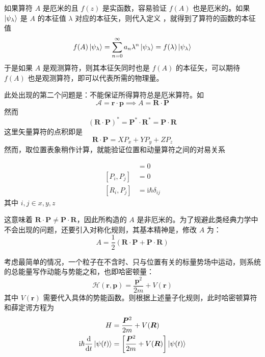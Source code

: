 \documentclass[cn,10pt,math=newtx,citestyle=gb7714-2015,bibstyle=gb7714-2015]{elegantbook}
\def\bm{\boldsymbol}
\def\mc{\mathcal}
\def\d{\mathrm d}
\def\i{\mathrm i}
\begin{document}
如果算符 $A$ 是厄米的且 $f(z)$ 是实函数，容易验证 $f(A)$ 也是厄米的。如果 $\ket{\psi_\lambda}$ 是 $A$ 的本征值 $\lambda$ 对应的本征矢，则代入定义 ，就得到了算符的函数的本征值
\begin{equation}
    \label{eq:opfunceigenval}
    f(A)\ket{\psi_\lambda}=\sum_{n=0}^\infty a_n\lambda^n\ket{\psi_\lambda}=f(\lambda)\ket{\psi_\lambda}
\end{equation}
于是如果 $A$ 是观测算符，则其本征矢同时也是 $f(A)$ 的本征矢，可以期待 $f(A)$ 也是观测算符，即可以代表所需的物理量。

此处出现的第二个问题是：不能保证所得算符总是厄米算符。如
\begin{equation}
   \bm{\mc A}=\bm r\cdot\bm p\implies A=\bm R\cdot\bm P
\end{equation}
然而
\begin{equation}
   (\bm R\cdot\bm P)^*=\bm P^*\cdot\bm R^*=\bm P\cdot\bm R
\end{equation}
这里矢量算符的点积即是
\begin{equation}
   \bm R\cdot\bm P=XP_x+YP_y+ZP_z
\end{equation}
然而，取位置表象稍作计算，就能验证位置和动量算符之间的对易关系
\begin{theorem}[正则对易关系]\label{thm:commuterp}
\begin{align}
    [R_i,R_j]&=0\\
    [P_i,P_j]&=0\\
    [R_i,P_j]&=\i\hbar\delta_{ij}
\end{align}
其中 $i,j\in{x,y,z}$
\end{theorem}
这意味着 $\bm R\cdot \bm P\ne \bm P\cdot \bm R$，因此所构造的 $A$ 是非厄米的。为了规避此类经典力学中不会出现的问题，还要引入对称化规则，其基本精神是，修改 $A$ 为：
\begin{equation}
   A=\frac 1 2(\bm R\cdot\bm P+\bm P\cdot\bm R)
\end{equation}

考虑最简单的情况，一个粒子在不含时、只与位置有关的标量势场中运动，则系统的总能量写作动能与势能之和，也即哈密顿量：
\begin{equation}
   \mc H(\bm r, \bm p)=\frac{\bm p^2}{2m}+V(\bm r)
\end{equation}
其中 $V(\bm r)$ 需要代入具体的势能函数。则根据上述量子化规则，此时哈密顿算符和薛定谔方程为
\begin{align}
   H&=\frac{\bm P^2}{2m}+V(\bm R)\\
   \i\hbar\frac{\d}{\d t}\ket{\psi(t)}&=\left[\frac{\bm P^2}{2m}+V(\bm R)\right]\ket{\psi(t)}
\end{align}
\end{document}
